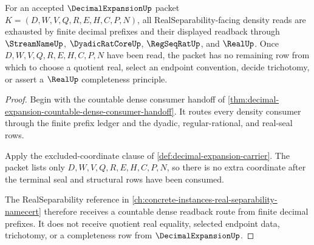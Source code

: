 \begin{theorem}\label{thm:decimal-expansion-prefix-density-exhaustion}
For an accepted $\DecimalExpansionUp$ packet $K=(D,W,V,Q,R,E,H,C,P,N)$, all RealSeparability-facing density reads are exhausted by finite decimal prefixes and their displayed readback through $\StreamNameUp$, $\DyadicRatCoreUp$, $\RegSeqRatUp$, and $\RealUp$. Once $D,W,V,Q,R,E,H,C,P,N$ have been read, the packet has no remaining row from which to choose a quotient real, select an endpoint convention, decide trichotomy, or assert a $\RealUp$ completeness principle.
\end{theorem}
\begin{proof}
Begin with the countable dense consumer handoff of \autoref{thm:decimal-expansion-countable-dense-consumer-handoff}. It routes every density consumer through the finite prefix ledger and the dyadic, regular-rational, and real-seal rows.

Apply the excluded-coordinate clause of \autoref{def:decimal-expansion-carrier}. The packet lists only $D,W,V,Q,R,E,H,C,P,N$, so there is no extra coordinate after the terminal seal and structural rows have been consumed.

The RealSeparability reference in \autoref{ch:concrete-instances-real-separability-namecert} therefore receives a countable dense readback route from finite decimal prefixes. It does not receive quotient real equality, selected endpoint data, trichotomy, or a completeness row from $\DecimalExpansionUp$.
\end{proof}


